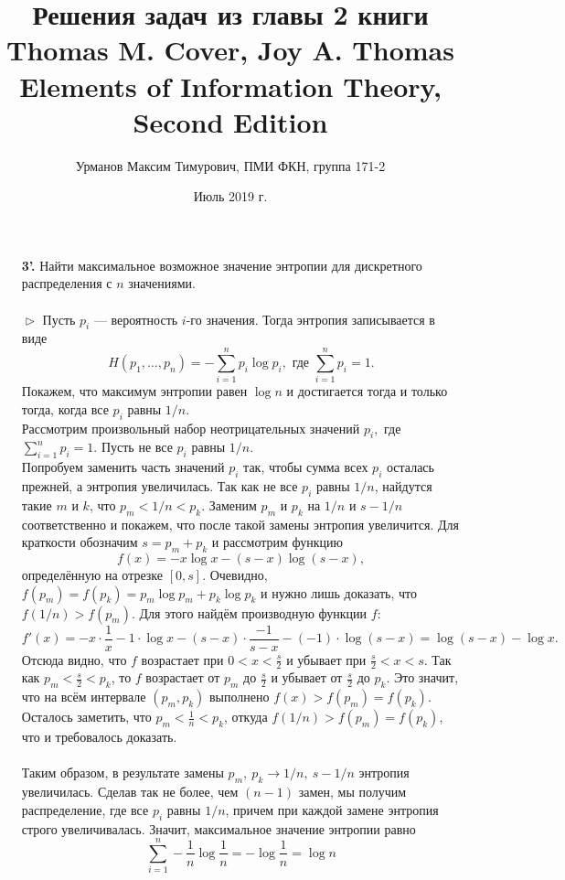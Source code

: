 \documentclass{article}
\newcommand{\ds}{\displaystyle}
\begin{document}
\author{Урманов Максим Тимурович, ПМИ ФКН, группа 171-2}
\title{Решения задач из главы 2 книги \\Thomas M. Cover, Joy A. Thomas \\Elements of Information Theory, Second Edition}
\date{Июль 2019 г.}
\maketitle
\parindent=0cm
\begin{enumerate}
\item[\bfseries 3'.] Найти максимальное возможное значение энтропии для дискретного распределения с $n$ значениями.
\\\\$\vartriangleright$  Пусть $p_i$ --- вероятность $i$-го значения. Тогда энтропия записывается в виде
$$H(p_1, \ldots, p_n) = -\sum_{i = 1}^n p_i \log p_i, \text{ где } \sum_{i = 1}^n p_i = 1.$$
Покажем, что максимум энтропии равен $\log n$ и достигается тогда и только тогда, когда все $p_i$ равны $1/n$.
\\Рассмотрим произвольный набор неотрицательных значений $p_i,$ где $\ds \sum_{i = 1}^n p_i = 1$. Пусть не все $p_i$ равны $1/n$. 
\\Попробуем заменить часть значений $p_i$ так, чтобы сумма всех $p_i$ осталась прежней, а энтропия увеличилась. Так как не все $p_i$ равны $1/n$, найдутся такие $m$ и $k$, что $p_m < 1/n < p_k$. Заменим $p_m$ и $p_k$ на $1/n$ и $s - 1/n$ соответственно и покажем, что после такой замены энтропия увеличится. Для краткости обозначим $s = p_m + p_k$ и рассмотрим функцию $$f(x) = -x\log x - (s - x)\log (s - x),$$ определённую на отрезке $[0, s]$. Очевидно, $f(p_m) = f(p_k) = p_m \log p_m + p_k \log p_k$ и нужно лишь доказать, что $f(1/n) > f(p_m)$. Для этого найдём производную функции $f$:
$$f'(x) = -x \cdot \frac{1}{x} - 1 \cdot \log x - (s - x) \cdot \frac{-1}{s - x} - (-1) \cdot \log (s - x) = \log(s - x) - \log x.$$
Отсюда видно, что $f$ возрастает при $\ds 0 < x < \frac{s}{2}$ и убывает при $\ds \frac{s}{2} < x < s$. Так как $\ds p_m < \frac{s}{2} < p_k$, то $f$ возрастает от $p_m$ до $\ds \frac{s}{2}$ и убывает от $\ds \frac{s}{2}$ до $p_k$. Это значит, что на всём интервале $(p_m, p_k)$ выполнено $f(x) > f(p_m) = f(p_k)$. Осталось заметить, что $\ds p_m < \frac{1}{n} < p_k$, откуда $f(1/n) > f(p_m) = f(p_k)$, что и требовалось доказать.
\\\\Таким образом, в результате замены $p_m,\ p_k \to 1/n,\ s - 1/n$ энтропия увеличилась. Сделав так не более, чем $(n - 1)$ замен, мы получим распределение, где все $p_i$ равны $1/n$, причем при каждой замене энтропия строго увеличивалась. Значит, максимальное значение энтропии равно $$\sum_{i = 1}^n -\frac{1}{n}\log \frac{1}{n} = - \log \frac{1}{n} = \log n$$

\end{enumerate}
\end{document}
